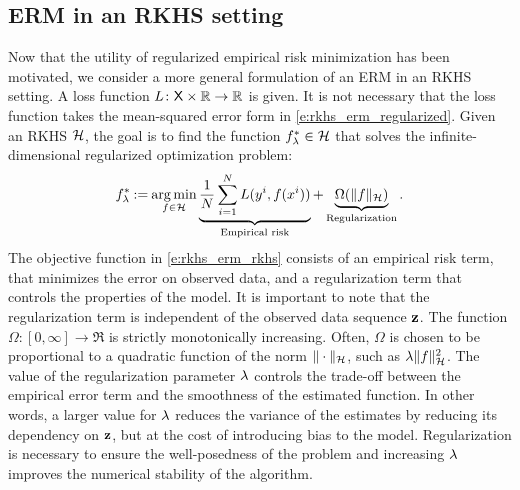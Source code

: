 \subsection{ERM in an RKHS setting}
\label{s:erm_rkhs}
Now that the utility of regularized empirical risk minimization has been motivated, we consider a more general formulation of an ERM in an RKHS setting. A loss function $L \colon  {\sf X}\times \mathbb{R} \to\mathbb{R}$ is given. It is not necessary that the loss function takes the mean-squared error form in \eqref{e:rkhs_erm_regularized}. Given an RKHS ${\cal H}$, the goal is to find the function $f_\lambda^*\in{\cal H}$ that solves the infinite-dimensional regularized optimization problem:
\begin{equation}
f_\reg^* \eqdef \argmin_{f\in\clH} \underbrace{\frac{1}{N} \sum_{i=1}^N L(y^i,  f(x^i))}_{\text{Empirical risk}}    + \underbrace{\Omega(\| f\|_{\clH})}_{\text{Regularization}}.
\label{e:rkhs_erm_rkhs}
\end{equation}
The objective function in \eqref{e:rkhs_erm_rkhs} consists of an empirical risk term, that minimizes the error on observed data, and a regularization term that controls the properties of the model. It is important to note that the regularization term is independent of the observed data sequence $\bf{z}$. The function $\Omega : [0, \infty] \to \Re$ is strictly monotonically increasing. Often, $\Omega$ is chosen to be proportional to a quadratic function of the norm $\|\cdot\|_{\cal H}$, such as $\lambda \|f\|^2_{\cal H}$.  The value of the regularization parameter $\lambda$ controls the trade-off between the empirical error term and the smoothness of the estimated function. In other words, a larger value for $\lambda$ reduces the variance of the estimates by reducing its dependency on $\bf{z}$, but at the cost of introducing bias to the model. Regularization is necessary to ensure the well-posedness of the problem and increasing $\lambda$ improves the numerical stability of the algorithm. 

